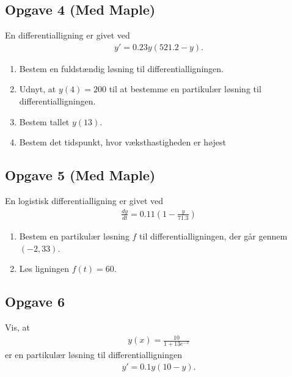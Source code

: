 \subsection*{Opgave 4 (Med Maple)}
En differentialligning er givet ved
\begin{align*}
	y' = 0.23y(521.2 - y).
\end{align*}
\begin{enumerate}[label = \roman*)]
	\item Bestem en fuldstændig løsning til differentialligningen.
	\item Udnyt, at $y(4) = 200$ til at bestemme en partikulær løsning til differentialligningen.
	\item Bestem tallet $y(13)$. 
	\item Bestem det tidspunkt, hvor væksthastigheden er højest
\end{enumerate}

\subsection*{Opgave 5 (Med Maple)}
En logistisk differentialligning er givet ved
\begin{align*}
	\frac{dy}{dt} = 0.11\left(1 - \frac{y}{71.3}\right)
\end{align*}
\begin{enumerate}[label=\roman*)]
	\item Bestem en partikulær løsning $f$ til differentialligningen, der går gennem $(-2,33)$.
	\item Løs ligningen $f(t) = 60$.
\end{enumerate}

\subsection*{Opgave 6}
Vis, at 
\begin{align*}
	y(x) = \frac{10}{1+13e^{-x}}
\end{align*}
er en partikulær løsning til differentialligningen
\begin{align*}
	y' = 0.1y(10-y).
\end{align*}
